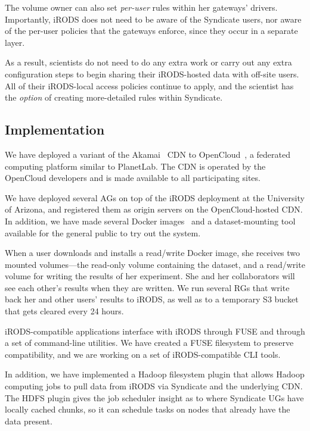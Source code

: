 The volume owner can also set \emph{per-user} rules within her
gateways' drivers.  Importantly, iRODS does not need to be aware of the
Syndicate users, nor aware of the per-user policies that the gateways enforce,
since they occur in a separate layer.

As a result, scientists do not need to do any extra work or carry out any extra
configuration steps to begin sharing their iRODS-hosted data with off-site users.
All of their iRODS-local access policies continue to apply, and the scientist
has the \emph{option} of creating more-detailed rules within Syndicate.

\subsection{Implementation}

We have deployed a variant of the Akamai~\cite{akamai} CDN to
OpenCloud~\cite{opencloud}, a federated computing platform similar to PlanetLab.
The CDN is operated by the OpenCloud developers and is made available to all
participating sites.

We have deployed several AGs on top of the iRODS deployment at the University of
Arizona, and registered them as origin servers on the OpenCloud-hosted CDN.  In
addition, we have made several Docker images~\cite{syndicate-website} and a dataset-mounting
tool~\cite{sdm} available for the general public to try out the system.

When a user downloads and installs a read/write Docker image, she receives two
mounted volumes---the read-only volume containing the dataset, and a read/write
volume for writing the results of her experiment.  She and her collaborators
will see each other's results when they are written.  We run several RGs that
write back her and other users' results to iRODS, as well as to a temporary S3
bucket that gets cleared every 24 hours.

iRODS-compatible applications interface with iRODS through FUSE and through a
set of command-line utilities.  We have created a FUSE filesystem to preserve
compatibility, and we are working on a set of iRODS-compatible CLI tools.

In addition, we have implemented a Hadoop filesystem plugin that allows Hadoop
computing jobs to pull data from iRODS via Syndicate and the underlying CDN.
The HDFS plugin gives the job scheduler insight as to where Syndicate UGs have
locally cached chunks, so it can schedule tasks on nodes that already have the
data present.

